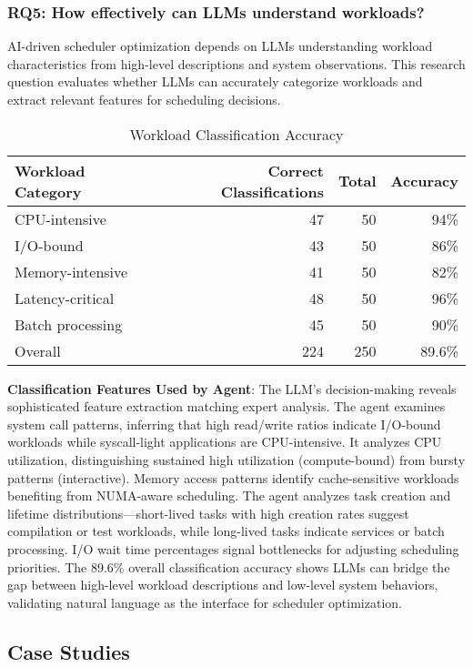 \subsubsection{RQ5: How effectively can LLMs understand workloads?}

AI-driven scheduler optimization depends on LLMs understanding workload characteristics from high-level descriptions and system observations. This research question evaluates whether LLMs can accurately categorize workloads and extract relevant features for scheduling decisions.

\begin{table}[h]
\caption{Workload Classification Accuracy}
\label{tab:workload-understanding}
\begin{tabular}{lrrr}
\toprule
Workload Category & Correct Classifications & Total & Accuracy \\
\midrule
CPU-intensive & 47 & 50 & 94\% \\
I/O-bound & 43 & 50 & 86\% \\
Memory-intensive & 41 & 50 & 82\% \\
Latency-critical & 48 & 50 & 96\% \\
Batch processing & 45 & 50 & 90\% \\
\midrule
Overall & 224 & 250 & 89.6\% \\
\bottomrule
\end{tabular}
\end{table}

\textbf{Classification Features Used by Agent}: The LLM's decision-making reveals sophisticated feature extraction matching expert analysis. The agent examines system call patterns, inferring that high read/write ratios indicate I/O-bound workloads while syscall-light applications are CPU-intensive. It analyzes CPU utilization, distinguishing sustained high utilization (compute-bound) from bursty patterns (interactive). Memory access patterns identify cache-sensitive workloads benefiting from NUMA-aware scheduling. The agent analyzes task creation and lifetime distributions—short-lived tasks with high creation rates suggest compilation or test workloads, while long-lived tasks indicate services or batch processing. I/O wait time percentages signal bottlenecks for adjusting scheduling priorities. The 89.6\% overall classification accuracy shows LLMs can bridge the gap between high-level workload descriptions and low-level system behaviors, validating natural language as the interface for scheduler optimization.

\subsection{Case Studies}

